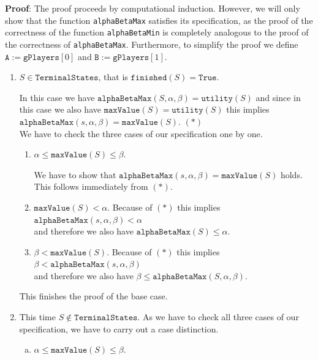 \noindent
\textbf{Proof}:  The proof proceeds by computational induction.  However, we will only show that
the function \texttt{alphaBetaMax} satisfies its specification, as the proof of the correctness of the function
\texttt{alphaBetaMin} is completely analogous to the proof of the correctness of \texttt{alphaBetaMax}.  Furthermore,
to simplify the proof we define $\mathtt{A} := \mathtt{gPlayers}[0]$ and $\mathtt{B} := \mathtt{gPlayers}[1]$.
\begin{enumerate}
\item[B.C:] $S \in \mathtt{TerminalStates}$, that is $\texttt{finished}(S) = \mathtt{True}$.

  In this case we have $\texttt{alphaBetaMax}(S, \alpha, \beta) = \texttt{utility}(S)$ and since in this case we also have
  $\texttt{maxValue}(S) = \texttt{utility}(S)$ this implies
  \\[0.2cm]
  \hspace*{1.3cm}
  $\texttt{alphaBetaMax}(s, \alpha, \beta) = \texttt{maxValue}(S)$.   \hspace*{\fill} $(*)$
  \\[0.2cm]
  We have to check the three cases of our specification one by one.
  \begin{enumerate}
  \item $\alpha \leq \mathtt{maxValue}(S) \leq \beta$.

        We have to show that $\texttt{alphaBetaMax}(s, \alpha, \beta) = \texttt{maxValue}(S)$ holds.
        This follows immediately from $(*)$.
  \item $\texttt{maxValue}(S) < \alpha$. Because of $(*)$ this implies
        \\[0.2cm]
        \hspace*{1.3cm}
        $\texttt{alphaBetaMax}(s, \alpha, \beta) < \alpha$
        \\[0.2cm]
        and therefore we also have $\texttt{alphaBetaMax}(S) \leq \alpha$.  
  \item $\beta < \mathtt{maxValue}(S)$.  Because of $(*)$ this implies
        \\[0.2cm]
        \hspace*{1.3cm}
        $\beta < \mathtt{alphaBetaMax}(s, \alpha, \beta)$
        \\[0.2cm]
        and therefore we also have $\beta \leq \mathtt{alphaBetaMax}(S, \alpha, \beta)$.
  \end{enumerate}
  This finishes the proof of the base case.
\item[I.S.:] This time $S\not\in \mathtt{TerminalStates}$.  As we have to check all three cases of our
  specification, we have to carry out a case distinction.
  \begin{enumerate}[(a)]
  \item $\alpha \leq \mathtt{maxValue}(S) \leq \beta$.


\end{enumerate}
\end{enumerate}
